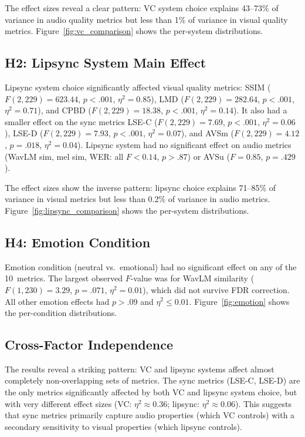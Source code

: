 \documentclass[11pt,a4paper]{article}
\begin{document}
The effect sizes reveal a clear pattern: VC system choice explains 43--73\% of variance in audio quality metrics but less than 1\% of variance in visual quality metrics.
Figure~\ref{fig:vc_comparison} shows the per-system distributions.

\subsection{H2: Lipsync System Main Effect}

Lipsync system choice significantly affected visual quality metrics: SSIM ($F(2,229)=623.44$, $p<.001$, $\eta^2=0.85$), LMD ($F(2,229)=282.64$, $p<.001$, $\eta^2=0.71$), and CPBD ($F(2,229)=18.38$, $p<.001$, $\eta^2=0.14$).
It also had a smaller effect on the sync metrics LSE-C ($F(2,229)=7.69$, $p<.001$, $\eta^2=0.06$), LSE-D ($F(2,229)=7.93$, $p<.001$, $\eta^2=0.07$), and AVSm ($F(2,229)=4.12$, $p=.018$, $\eta^2=0.04$).
Lipsync system had no significant effect on audio metrics (WavLM sim, mel sim, WER: all $F<0.14$, $p>.87$) or AVSu ($F=0.85$, $p=.429$).

The effect sizes show the inverse pattern: lipsync choice explains 71--85\% of variance in visual metrics but less than 0.2\% of variance in audio metrics.
Figure~\ref{fig:lipsync_comparison} shows the per-system distributions.

\subsection{H4: Emotion Condition}

Emotion condition (neutral vs.\ emotional) had no significant effect on any of the 10~metrics.
The largest observed $F$-value was for WavLM similarity ($F(1,230)=3.29$, $p=.071$, $\eta^2=0.01$), which did not survive FDR correction.
All other emotion effects had $p>.09$ and $\eta^2\leq0.01$.
Figure~\ref{fig:emotion} shows the per-condition distributions.

\subsection{Cross-Factor Independence}

The results reveal a striking pattern: VC and lipsync systems affect almost completely non-overlapping sets of metrics.
The sync metrics (LSE-C, LSE-D) are the only metrics significantly affected by both VC and lipsync system choice, but with very different effect sizes (VC: $\eta^2 \approx 0.36$; lipsync: $\eta^2 \approx 0.06$).
This suggests that sync metrics primarily capture audio properties (which VC controls) with a secondary sensitivity to visual properties (which lipsync controls).
\end{document}
